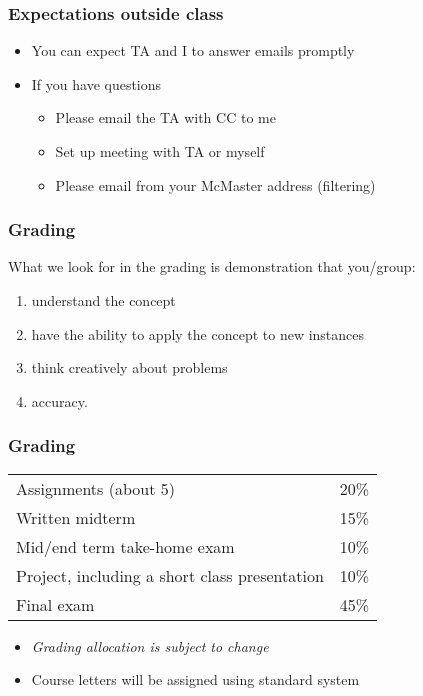 \begin{frame}\frametitle{Expectations outside class}
	\begin{itemize}
		\item	You can expect TA and I to answer emails promptly
		\item	If you have questions
			\begin{itemize}
				\item	Please email the TA with CC to me 
				\item	Set up meeting with TA or myself
				\item	Please email from your McMaster address (filtering)
			\end{itemize}
	\end{itemize}
\end{frame}

\begin{frame}\frametitle{Grading}
	What we look for in the grading is demonstration that you/group:
	\begin{enumerate}
		\item	understand the concept
		\item	have the ability to apply the concept to new instances
		\item	think creatively about problems
		\item	accuracy.
	\end{enumerate}
\end{frame}

\begin{frame}\frametitle{Grading}
	\begin{tabular}{ll}\\
		Assignments (about 5)       	& 20\% \\
	    Written midterm        			& 15\% \\
	    Mid/end term take-home exam		& 10\% \\
	    Project, including a short class presentation& 10\% \\
	    Final exam 						& 45\% \\
	\end{tabular}
	
	\vspace{12pt}
	\vspace{12pt}
	
	\begin{itemize}
		\item	\emph{Grading allocation is subject to change}
		\item	Course letters will be assigned using standard system
	\end{itemize}
\end{frame}


